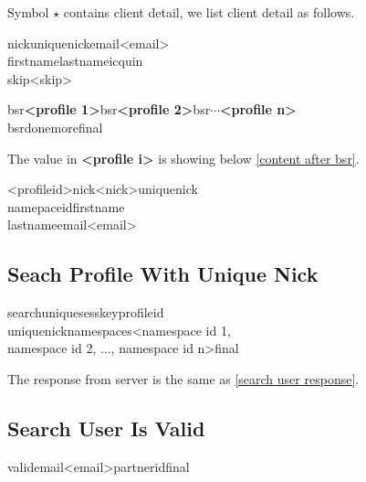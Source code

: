 \documentclass[oneside,titlepage,a4paper]{Definition/retrospy} %
\begin{document}
Symbol $\star$ contains client detail, we list client detail as follows.
\begin{mybox}
	\tbs nick\tbs<nick name>\tbs uniquenick\tbs <unique nick>\tbs email\tbs<email>\\\tbs firstname\tbs<first name>\tbs lastname\tbs<last name>\tbs icquin\tbs <icq uin>\\\tbs skip\tbs<skip>
\end{mybox}


\ServerResponse

\begin{mybox}[label = search user response]
	\tbs bsr\tbs\textbf{<profile 1>}\tbs bsr\tbs\textbf{<profile 2>}\tbs bsr\tbs $\cdots$\tbs \textbf{<profile n>}\\
	\tbs bsrdone\tbs\tbs more\tbs<number of rest profiles>\tbs final\tbs
\end{mybox}
The value in \textbf{<profile i>} is showing below \ref{content after bsr}.
\begin{mybox}[label = content after bsr]
<profileid>\tbs nick\tbs<nick>\tbs uniquenick\\\tbs namepaceid\tbs firstname\\\tbs lastname\tbs email\tbs<email>
\end{mybox}
\subsection{Seach Profile With Unique Nick}
\ClientRequest
\begin{mybox}
	\tbs searchunique\tbs\tbs sesskey\tbs<session key>\tbs profileid\tbs<profile id>\\\tbs uniquenick\tbs<unique nick>\tbs namespaces\tbs<namespace id 1,\\ namespace id 2, ..., namespace id n>\tbs final\tbs
\end{mybox}
\ServerResponse
The response from server is the same as \ref{search user response}.
\subsection{Search User Is Valid}
\ClientRequest

\begin{mybox}
	\tbs valid\tbs\tbs email\tbs<email>\tbs partnerid\tbs<partner id>\tbs final\tbs
\end{mybox}

\ServerResponse
\end{document}
